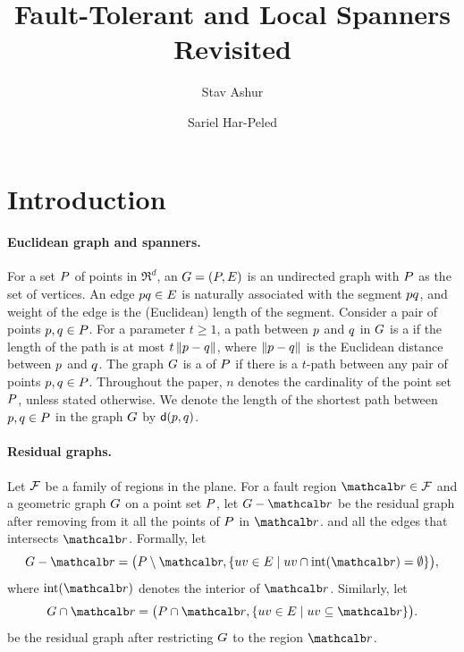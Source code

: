 \documentclass[12pt]{article}%
\begin{document}
\title{Fault-Tolerant and Local Spanners Revisited}
	
\author{%
   Stav Ashur%
   \StavThanks{}%
   \and%
   Sariel Har-Peled%
}%
	
\maketitle



\section{Introduction}

\paragraph{Euclidean graph and spanners.}
For a set $P$ of points in $\Re^d$, an 
$G = (P, E)$ is an undirected graph with $P$ as the set of
vertices. An edge $p q \in E$ is naturally associated with the
segment $pq$, and weight of the edge is the (Euclidean) length of
the segment.  Consider a pair of points $p,q \in P$. For a
parameter $t \geq 1$, a path between $p$ and $q$ in $G$ is a
 if the length of the path is at most
$t \left\| p - q \right\|$, where $\left\| p - q \right\|$ is the Euclidean distance
between $p$ and $q$.  The graph $G$ is a  of
$P$ if there is a $t$-path between any pair of points
$p,q\in P$.  Throughout the paper, $n$ denotes the cardinality
of the point set $P$, unless stated otherwise. We denote the length
of the shortest path between $p,q\in P$ in the graph $G$ by
$\dGY{\pa}{\pb}$.

\paragraph{Residual graphs.}

Let $\mathcal{F}$ be a family of regions in the plane. For a fault region
$\region \in \FF$ and a geometric graph $G$ on a point set $P$, let
$\G \gminus \region$ be the residual graph after removing from it all
the points of $P$ in $\region$. and all the edges that intersects
$\region$.  Formally, let
\begin{equation*}
    \G \gminus \region%
    =%
    \bigl( \PS \setminus \region, \Set{ uv \in \EG }{ uv \cap
       \interiorX{\region} = \emptyset} \bigr),
\end{equation*}
where $\interiorX{\region}$ denotes the interior of
$\region$. Similarly, let
\begin{equation*}
    \restrictY{\G}{\region}%
    =%
    \bigl( \PS \cap {\region},
    \Set{uv \in \EG}{ uv \subseteq {\region} } \bigr).
\end{equation*}
be the residual graph after restricting $G$ to the region $\region$.
\end{document}
